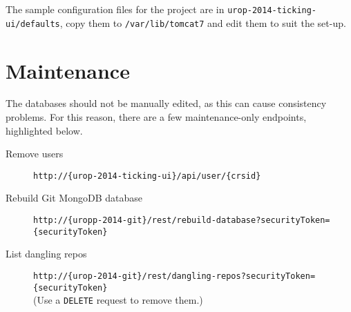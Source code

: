 \documentclass[12pt,a4paper]{article}
\newcommand{\tomcatwd}{{\tt /var/\hspace{0pt}lib/\hspace{0pt}tomcat7}}
\begin{document}
The sample configuration files for the project are in {\tt urop-2014-ticking-ui/defaults}, copy them to \tomcatwd{}{} and edit them to suit the set-up.

\section{Maintenance}
The databases should not be manually edited, as this can cause consistency problems.
For this reason, there are a few maintenance-only endpoints, highlighted below.
\begin{description}
  \item[Remove users] {\tt http://\{urop-2014-ticking-ui\}/\hspace{0pt}api/\hspace{0pt}user/\hspace{0pt}\{crsid\}}
  \item[Rebuild Git MongoDB database] {\tt http://\{uropp-2014-git\}/\hspace{0pt}rest/\hspace{0pt}rebuild-database?\hspace{0pt}securityToken=\hspace{0pt}\{securityToken\}}
  \item[List dangling repos] {\tt http://\{urop-2014-git\}/\hspace{0pt}rest/\hspace{0pt}dangling-repos?\hspace{0pt}securityToken=\hspace{0pt}\{securityToken\}}\\
    (Use a {\tt DELETE} request to remove them.)
\end{description}
\end{document}

